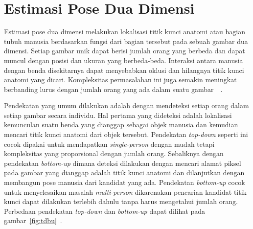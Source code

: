 \section{Estimasi Pose Dua Dimensi}
\label{sec:2-EstimasiPoseDuaDimensi}

Estimasi pose dua dimensi melakukan lokalisasi titik kunci anatomi atau bagian tubuh manusia
berdasarkan fungsi dari bagian tersebut pada sebuah gambar dua dimensi.
Setiap gambar unik dapat berisi jumlah orang
yang berbeda dan dapat muncul dengan posisi dan ukuran yang berbeda-beda. Interaksi antara manusia
dengan benda disekitarnya dapat menyebabkan oklusi dan hilangnya titik kunci anatomi yang dicari.
Kompleksitas permasalahan ini juga semakin meningkat berbanding lurus dengan jumlah orang yang ada
dalam suatu gambar~\cite{psfor}~\cite{kposolet}.

Pendekatan yang umum dilakukan adalah dengan mendeteksi setiap orang dalam setiap gambar secara
individu. Hal pertama yang dideteksi adalah lokalisasi kemunculan suatu benda yang dianggap sebagai
objek manusia dan kemudian mencari titik kunci anatomi dari objek tersebut.
Pendekatan \textit{top-down} seperti ini cocok dipakai untuk mendapatkan
\textit{single-person} dengan mudah tetapi kompleksitas yang proporsional dengan jumlah orang.
Sebaliknya dengan pendekatan \textit{bottom-up} dimana deteksi dilakukan dengan mencari alamat piksel
pada gambar yang dianggap adalah titik kunci anatomi dan dilanjutkan dengan membangun pose manusia
dari kandidat yang ada. Pendekatan \textit{bottom-up} cocok untuk menyelesaikan masalah
\textit{multi-person} dikarenakan pencarian kandidat titik kunci dapat dilakukan terlebih dahulu tanpa
harus mengetahui jumlah orang. Perbedaan pendekatan \textit{top-down} dan \textit{bottom-up}
dapat dilihat pada gambar~\ref{fig:tdbu}~\cite{8765346}.

